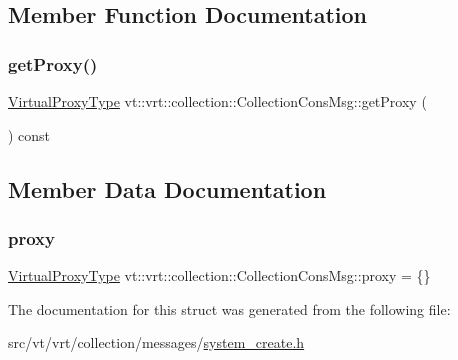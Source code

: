 \subsection{Member Function Documentation}
\mbox{\label{structvt_1_1vrt_1_1collection_1_1_collection_cons_msg_a53a70b2333e8bd56e4a8c72c76b35283}} 
\subsubsection{\texorpdfstring{get\+Proxy()}{getProxy()}}
{\footnotesize\ttfamily \hyperlink{namespacevt_a1b417dd5d684f045bb58a0ede70045ac}{Virtual\+Proxy\+Type} vt\+::vrt\+::collection\+::\+Collection\+Cons\+Msg\+::get\+Proxy (\begin{DoxyParamCaption}{ }\end{DoxyParamCaption}) const\hspace{0.3cm}{\ttfamily [inline]}}



\subsection{Member Data Documentation}
\mbox{\label{structvt_1_1vrt_1_1collection_1_1_collection_cons_msg_aa059f3f1cab01c7858b13752eae287d5}} 
\subsubsection{\texorpdfstring{proxy}{proxy}}
{\footnotesize\ttfamily \hyperlink{namespacevt_a1b417dd5d684f045bb58a0ede70045ac}{Virtual\+Proxy\+Type} vt\+::vrt\+::collection\+::\+Collection\+Cons\+Msg\+::proxy = \{\}}



The documentation for this struct was generated from the following file\+:\begin{DoxyCompactItemize}
\item 
src/vt/vrt/collection/messages/\hyperlink{system__create_8h}{system\+\_\+create.\+h}\end{DoxyCompactItemize}

